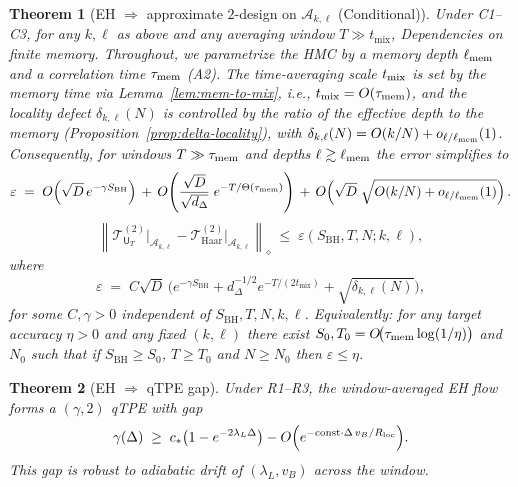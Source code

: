 \documentclass[aps,prd,preprint,onecolumn,superscriptaddress,nofootinbib,longbibliography,floatfix,11pt,showpacs,showkeys]{revtex4-2}
\newcommand{\HMC}{\textsc{HMC}\xspace}
\theoremstyle{plain}
\newtheorem{theorem}{Theorem}
\theoremstyle{definition}
\theoremstyle{remark}
\begin{document}
\begin{theorem}[EH $\Rightarrow$ approximate $2$-design on $\mathscr{A}_{k,\ell}$ (Conditional)]
%
\label{thm:EH-2design}
\label{thm:eh2design}%
Under C1--C3, for any $k,\ell$ as above and any averaging window $T\gg t_{\mathrm{mix}}$,
\noindent\emph{Dependencies on finite memory.} Throughout, we parametrize the \HMC{} by a memory depth $\ell_{\rm mem}$ and a correlation time $\tau_{\rm mem}$ (A2).
The time-averaging scale $t_{\rm mix}$ is set by the memory time via Lemma~\ref{lem:mem-to-mix}, i.e., $t_{\rm mix}=O(\tau_{\rm mem})$,
and the locality defect $\delta_{k,\ell}(N)$ is controlled by the ratio of the effective depth to the memory (Proposition~\ref{prop:delta-locality}),
with $\delta_{k,\ell}(N)=O(k/N)+o_{\ell/\ell_{\rm mem}}(1)$.
Consequently, for windows $T\gg \tau_{\rm mem}$ and depths $\ell\gtrsim \ell_{\rm mem}$ the error simplifies to
\begin{equation}
 \varepsilon \;=\; O\!\left( \sqrt{D}\,e^{-\gamma S_{\mathrm{BH}}} \right)
 \, +\, O\!\left( \frac{\sqrt{D}}{\sqrt{d_\Delta}}\; e^{-T/\Theta(\tau_{\rm mem})} \right)
 \, +\, O\!\left( \sqrt{D}\;\sqrt{O(k/N)+o_{\ell/\ell_{\rm mem}}(1)} \right).
\end{equation}
\begin{equation}\label{eq:main-eps}
 \left\| \mathcal{T}^{(2)}_{\mathsf{U}_T}\big|_{\mathscr{A}_{k,\ell}} - \mathcal{T}^{(2)}_{\mathrm{Haar}}\big|_{\mathscr{A}_{k,\ell}} \right\|_{\diamond}
 \;\le\; \varepsilon(S_{\mathrm{BH}},T,N;k,\ell),
\end{equation}
where
\begin{equation}
 \varepsilon \;=\; C \sqrt{D}\,\Big( e^{-\gamma S_{\mathrm{BH}}}
 + d_\Delta^{-1/2} e^{-T/(2t_{\mathrm{mix}})} + \sqrt{\delta_{k,\ell}(N)} \Big),
\end{equation}
for some $C,\gamma>0$ independent of $S_{\mathrm{BH}},T,N,k,\ell$.
Equivalently: for any target accuracy $\eta>0$ and any fixed $(k,\ell)$ there exist $S_0,T_0=O\!\big(\tau_{\rm mem}\log(1/\eta)\big)$ and $N_0$ such that if $S_{\mathrm{BH}}\ge S_0$, $T\ge T_0$ and $N\ge N_0$ then $\varepsilon\le \eta$.
\end{theorem}

\begin{theorem}[EH $\Rightarrow$ qTPE gap]\label{thm:eh-qtpe-gap}
Under R1--R3, the window-averaged EH flow forms a $(\gamma,2)$ qTPE with gap
\[
\gamma(\Delta) \;\ge\; c_*\!\left(1-e^{-2\lambda_L \Delta}\right) - O\!\left(e^{-\mathrm{const}\cdot \Delta\, v_B/R_{\rm loc}}\right)\!.
\]
This gap is robust to adiabatic drift of $(\lambda_L, v_B)$ across the window.
\end{theorem}
\end{document}
